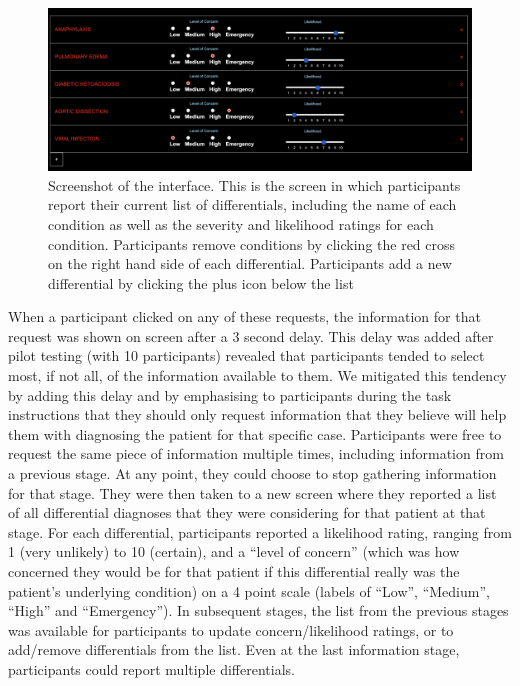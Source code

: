 \documentclass[a4paper, nobind]{templates/ociamthesis}
\begin{document}
\begin{figure}[H]

{\centering \includegraphics[width=1\linewidth]{./assets/Screenshot2} 

}

\caption[Online Study: Screenshot 2]{Screenshot of the interface. This is the screen in which participants report their current list of differentials, including the name of each condition as well as the severity and likelihood ratings for each condition. Participants remove conditions by clicking the red cross on the right hand side of each differential. Participants add a new differential by clicking the plus icon below the list}\label{fig:screenshot2}
\end{figure}

When a participant clicked on any of these requests, the information for that request was shown on screen after a 3 second delay. This delay was added after pilot testing (with 10 participants) revealed that participants tended to select most, if not all, of the information available to them. We mitigated this tendency by adding this delay and by emphasising to participants during the task instructions that they should only request information that they believe will help them with diagnosing the patient for that specific case. Participants were free to request the same piece of information multiple times, including information from a previous stage. At any point, they could choose to stop gathering information for that stage. They were then taken to a new screen where they reported a list of all differential diagnoses that they were considering for that patient at that stage. For each differential, participants reported a likelihood rating, ranging from 1 (very unlikely) to 10 (certain), and a ``level of concern'' (which was how concerned they would be for that patient if this differential really was the patient's underlying condition) on a 4 point scale (labels of ``Low'', ``Medium'', ``High'' and ``Emergency''). In subsequent stages, the list from the previous stages was available for participants to update concern/likelihood ratings, or to add/remove differentials from the list. Even at the last information stage, participants could report multiple differentials.\\
\end{document}
